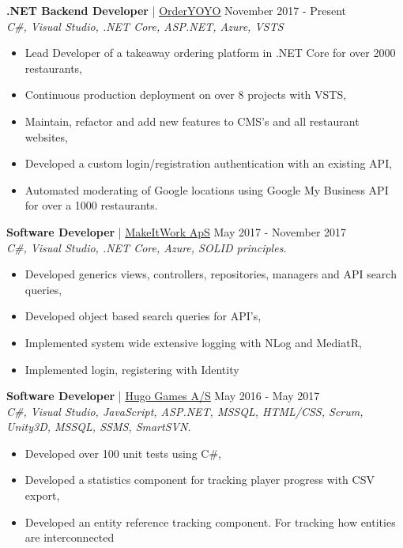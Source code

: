 \documentclass[margin, 10pt, hidelinks]{res} %
\newcommand{\emphasize}{\large\bfseries} %
\begin{document}
\begin{resume}
{\emphasize .NET Backend Developer} | \href{https://orderyoyo.com/}{\underline{OrderYOYO}}    \hfill November 2017 - Present  \\
{\it C\#, Visual Studio, .NET Core, ASP.NET, Azure, VSTS} %
\begin{itemize} \setlength{\itemindent}{-0.1in}\itemsep 0pt %
\item Lead Developer of a takeaway ordering platform in .NET Core for over 2000 restaurants,
\item Continuous production deployment on over 8 projects with VSTS,
\item Maintain, refactor and add new features to CMS's and all restaurant websites,
\item Developed a custom login/registration authentication with an existing API,
\item Automated moderating of Google locations using Google My Business API for over a 1000 restaurants.
\end{itemize}

{\emphasize Software Developer} | \href{http://www.makeitwork.dk}{\underline{MakeItWork ApS}}  \hfill May 2017 - November 2017  \\
{\it C\#, Visual Studio, .NET Core, Azure, SOLID principles. } %
\begin{itemize} \setlength{\itemindent}{-0.1in}\itemsep 0pt %
\item Developed generics views, controllers, repositories, managers and API search queries,
\item Developed object based search queries for API's,
\item Implemented system wide extensive logging with NLog and MediatR,
\item Implemented login, registering with Identity
\end{itemize}

{\emphasize Software Developer} | \href{https://www.hugogames.com}{\underline{Hugo Games A/S}}   \hfill May 2016 - May 2017  \\
{\it C\#, Visual Studio, JavaScript, ASP.NET, MSSQL, HTML/CSS, Scrum, Unity3D, MSSQL, SSMS, SmartSVN.} %
\begin{itemize} \setlength{\itemindent}{-0.1in}\itemsep 0pt %
\item Developed over 100 unit tests using C\#,
\item Developed a statistics component for tracking player progress with CSV export,
\item Developed an entity reference tracking component. For tracking how entities are interconnected
\end{itemize}



\end{resume}
\end{document}
